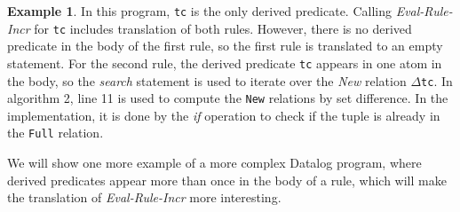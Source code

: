 \documentclass[twoside,11pt,openright]{report}
\theoremstyle{definition}
\newtheorem{exmp}{Example}[chapter]
\begin{document}
\begin{exmp}
  In this program, \texttt{tc} is the only derived predicate. Calling \textit{Eval-Rule-Incr} for \texttt{tc} includes
  translation of both rules. However, there is no derived predicate in the body of the first rule,
  so the first rule is translated to an empty statement. For the second rule, the derived predicate \texttt{tc}
  appears in one atom in the body, so the \textit{search} statement is used to iterate over the \textit{New} relation
  $\Delta$\texttt{tc}. In algorithm 2, line 11 is used to compute the \texttt{New} relations by set difference.
  In the implementation, it is done by the \textit{if} operation to check if the tuple is already in the
  \texttt{Full} relation.
\end{exmp}
\label{exmp:tc-ram}

We will show one more example of a more complex Datalog program,
where derived predicates appear more than once in the body of a rule,
which will make the translation of \textit{Eval-Rule-Incr} more interesting.
\end{document}
